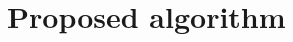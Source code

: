 \documentclass[11pt]{article}
\newcommand\myworries[1]{\textcolor{red}{#1}}
\begin{document}
%

\section{Proposed algorithm}\label{algorithm}
\end{document}
